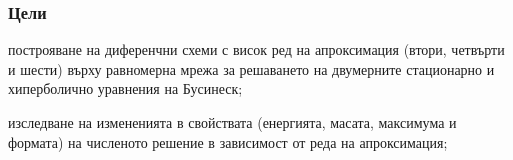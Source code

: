 \documentclass{beamer}
\newcommand{\rf}[1]{(\ref{#1})}
\begin{document}
\begin{frame}
\frametitle{Цели }
\begin{itemize}
{%
 \item построяване на диференчни схеми с висок ред на апроксимация (втори, четвърти и шести) върху равномерна мрежа за решаването на двумерните стационарно и хиперболично уравнения на Бусинеск;
  \item изследване на измененията в свойствата (енергията, масата, максимума и формата) на численото решение в зависимост от реда на апроксимация;
  }
\end{itemize}
\end{frame}
\end{document}
